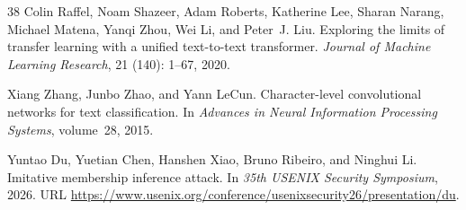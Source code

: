 \begin{thebibliography}{38}
Colin Raffel, Noam Shazeer, Adam Roberts, Katherine Lee, Sharan Narang, Michael
  Matena, Yanqi Zhou, Wei Li, and Peter~J. Liu.
\newblock Exploring the limits of transfer learning with a unified text-to-text
  transformer.
\newblock \emph{Journal of Machine Learning Research}, 21
  (140): 1--67, 2020.

Xiang Zhang, Junbo Zhao, and Yann LeCun.
\newblock Character-level convolutional networks for text classification.
\newblock In \emph{Advances in Neural Information Processing Systems},
  volume~28, 2015.

Yuntao Du, Yuetian Chen, Hanshen Xiao, Bruno Ribeiro, and Ninghui Li.
\newblock Imitative membership inference attack.
\newblock In \emph{35th USENIX Security Symposium}, 2026.
\newblock URL
  \url{https://www.usenix.org/conference/usenixsecurity26/presentation/du}.

\end{thebibliography}
